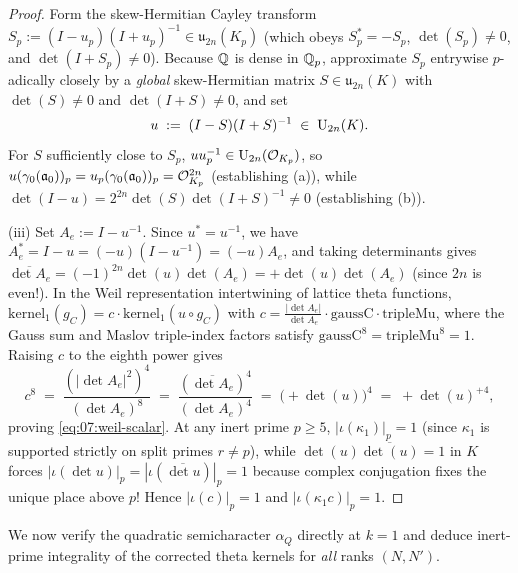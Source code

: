 \begin{proof}
Form the skew-Hermitian Cayley transform $S_p := (I - u_p)(I + u_p)^{-1} \in \mathfrak{u}_{2n}(K_p)$ (which obeys $S_p^* = -S_p$, $\det(S_p) \neq 0$, and $\det(I + S_p) \neq 0$). Because $\mathbb{Q}$ is dense in $\mathbb{Q}_p$, approximate $S_p$ entrywise $p$-adically closely by a \emph{global} skew-Hermitian matrix $S \in \mathfrak{u}_{2n}(K)$ with $\det(S) \neq 0$ and $\det(I + S) \neq 0$, and set
\[
  u \;:=\; (I - S)(I + S)^{-1} \;\in\; \mathrm{U}_{2n}(K).
\]
For $S$ sufficiently close to $S_p$, $u u_p^{-1} \in \mathrm{U}_{2n}(\mathcal{O}_{K_p})$, so $u(\gamma_0(\mathfrak{a}_0))_p = u_p(\gamma_0(\mathfrak{a}_0))_p = \mathcal{O}_{K_p}^{2n}$ (establishing (a)), while $\det(I - u) = 2^{2n}\det(S)\det(I + S)^{-1} \neq 0$ (establishing (b)).

(iii) Set $A_e := I - u^{-1}$. Since $u^* = u^{-1}$, we have $A_e^* = I - u = (-u)(I - u^{-1}) = (-u) A_e$, and taking determinants gives $\overline{\det A_e} = (-1)^{2n} \det(u) \det(A_e) = +\det(u)\det(A_e)$ (since $2n$ is even!). In the Weil representation intertwining of lattice theta functions, $\mathrm{kernel}_1(g_C) = c \cdot \mathrm{kernel}_1(u \circ g_C)$ with $c = \frac{|\det A_e|}{\det A_e} \cdot \mathrm{gaussC} \cdot \mathrm{tripleMu}$, where the Gauss sum and Maslov triple-index factors satisfy $\mathrm{gaussC}^8 = \mathrm{tripleMu}^8 = 1$. Raising $c$ to the eighth power gives
\[
  c^8 \;=\; \frac{(|\det A_e|^2)^4}{(\det A_e)^8} \;=\; \frac{(\overline{\det A_e})^4}{(\det A_e)^4}
  \;=\; \bigl(+\det(u)\bigr)^4 \;=\; +\det(u)^{+4},
\]
proving \eqref{eq:07:weil-scalar}. At any inert prime $p \ge 5$, $|\iota(\kappa_1)|_p = 1$ (since $\kappa_1$ is supported strictly on split primes $r \neq p$), while $\det(u)\overline{\det(u)} = 1$ in $K$ forces $|\iota(\det u)|_p = |\iota(\overline{\det u})|_p = 1$ because complex conjugation fixes the unique place above $p$! Hence $|\iota(c)|_p = 1$ and $|\iota(\kappa_1 c)|_p = 1$.
\end{proof}

We now verify the quadratic semicharacter $\alpha_Q$ directly at $k = 1$ and deduce inert-prime integrality of the corrected theta kernels for \emph{all} ranks $(N, N')$.

